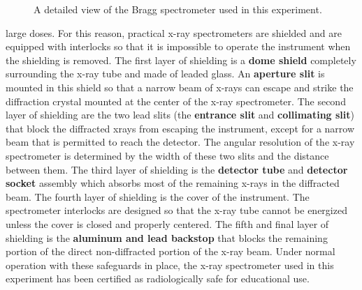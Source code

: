 \begin{figure}
\caption{A detailed view of the Bragg spectrometer used in this experiment.}
\label{fig:xr8}
\end{figure}

\noindent large doses. For this reason, practical x-ray spectrometers are shielded and are equipped with interlocks so that it is impossible to operate the instrument when the shielding is removed. The first layer of shielding is a {\bf dome shield} completely surrounding the x-ray tube and made of leaded glass. An {\bf aperture slit} is mounted in this shield so that a narrow beam of x-rays can escape and strike the diffraction crystal mounted at the center of the x-ray spectrometer. The second layer of shielding are the two lead slits (the {\bf entrance slit} and {\bf collimating slit}) that block the diffracted xrays from escaping the instrument, except for a narrow beam that is permitted to reach the detector. The angular resolution of the x-ray spectrometer is determined by the width of these two slits and the distance between them. The third layer of shielding is the {\bf detector tube} and {\bf detector socket} assembly which absorbs most of the remaining x-rays in the diffracted beam. The fourth layer of shielding is the cover of the instrument. The spectrometer interlocks are designed so that the x-ray tube cannot be energized unless the cover is closed and properly centered. The fifth and final layer of shielding is the {\bf aluminum and lead backstop} that blocks the remaining portion of the direct non-diffracted portion of the x-ray beam. Under normal operation with these safeguards in place, the x-ray spectrometer used in this experiment has been certified as radiologically safe for educational use.

